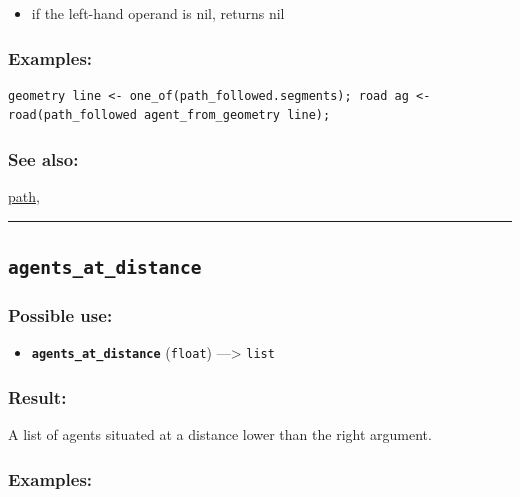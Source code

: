 \documentclass[]{book}
\providecommand{\tightlist}{%
  \setlength{\itemsep}{0pt}\setlength{\parskip}{0pt}}
\theoremstyle{definition}
\theoremstyle{definition}
\theoremstyle{definition}
\theoremstyle{remark}
\begin{document}
\begin{itemize}
\tightlist
\item
  if the left-hand operand is nil, returns nil
\end{itemize}

\subsubsection{Examples:}\label{examples-21}

\begin{verbatim}
geometry line <- one_of(path_followed.segments); road ag <- road(path_followed agent_from_geometry line); 
\end{verbatim}

\subsubsection{See also:}\label{see-also-20}

\href{operators-n-to-r.html\#path}{path},

\begin{center}\rule{0.5\linewidth}{\linethickness}\end{center}

\subsection{\texorpdfstring{\texttt{agents\_at\_distance}}{agents\_at\_distance}}\label{agents_at_distance}

\subsubsection{Possible use:}\label{possible-use-29}

\begin{itemize}
\tightlist
\item
  \textbf{\texttt{agents\_at\_distance}} (\texttt{float})
  ---\textgreater{} \texttt{list}
\end{itemize}

\subsubsection{Result:}\label{result-28}

A list of agents situated at a distance lower than the right argument.

\subsubsection{Examples:}\label{examples-22}
\end{document}
